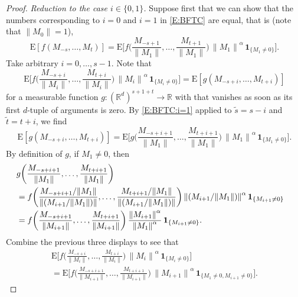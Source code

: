 \documentclass{aptpubarxiv}
\numberwithin{equation}{section}
\begin{document}
\begin{proof}
\emph{Reduction to the case $i \in \{ 0, 1 \}$.}
Suppose first that we can show that the numbers corresponding to $i = 0$ and $i = 1$ in \eqref{E:BFTC} are equal, that is (note that $\|M_0\|=1$),
\begin{equation}
\label{E:BFTC:i=1}
  {\mathrm{E}} [ f ( M_{-s}, \ldots, M_t ) ] 
  = {\mathrm{E}} \biggl[ f \biggl( \frac{M_{-s+1}}{{\|{M_1}\|}}, \ldots, \frac{M_{t+1}}{{\|{M_1}\|}} \biggr) \, {\|{M_1}\|}^\alpha \, {\boldsymbol{1}}_{ \{ M_1 \ne 0 \} } \biggr].
\end{equation}
Take arbitrary $i = 0, \ldots, s-1$. Note that
\[
  {\mathrm{E}} \biggl[ f \biggl( \frac{M_{-s+i}}{{\|{M_i}\|}}, \ldots, \frac{M_{t+i}}{{\|{M_i}\|}} \biggr) \, {\|{M_i}\|}^\alpha \, {\boldsymbol{1}}_{ \{ M_i \ne 0 \} } \biggr]
  = {\mathrm{E}} [ g( M_{-s+i}, \ldots, M_{t+i} )]
\]
for a measurable function $g : ({\mathbb{R}}^d)^{s+1+t} \to {\mathbb{R}}$ with
that vanishes as soon as its first $d$-tuple of arguments is zero. By \eqref{E:BFTC:i=1} applied to $\tilde{s}=s-i$ and $\tilde{t}=t+i$, we find
\[
  {\mathrm{E}} [ g( M_{-s+i}, \ldots, M_{t+i} )]
  = {\mathrm{E}} \biggl[ g \biggl( \frac{M_{-s+i+1}}{{\|{M_1}\|}}, \ldots, \frac{M_{t+i+1}}{{\|{M_1}\|}} \biggr) \, {\|{M_1}\|}^\alpha \, {\boldsymbol{1}}_{ \{ M_1 \ne 0 \} } \biggr].
\]
By definition of $g$, if $M_1 \ne 0$, then
\begin{align*}
  \lefteqn{
  g \biggl( \frac{M_{-s+i+1}}{{\|{M_1}\|}}, \ldots, \frac{M_{t+i+1}}{{\|{M_1}\|}} \biggr)
  } \\
  &= f \biggl( \frac{M_{-s+i+1} / {\|{M_1}\|}}{{\|{(M_{i+1} / {\|{M_1}\|})}\|}}, \ldots, \frac{M_{t+i+1} / {\|{M_1}\|}}{{\|{(M_{i+1} / {\|{M_1}\|})}\|}}  \biggr) \, {\|{(M_{i+1} / {\|{M_1}\|})}\|}^\alpha \, {\boldsymbol{1}}_{ \{ M_{i+1} \ne 0 \} } \\
  &= f \biggl( \frac{M_{-s+i+1}}{{\|{M_{i+1}}\|}}, \ldots, \frac{M_{t+i+1}}{{\|{M_{i+1}}\|}} \biggr) \, \frac{{\|{M_{i+1}}\|}^\alpha}{{\|{M_1}\|}^\alpha} \, {\boldsymbol{1}}_{ \{ M_{i+1} \ne 0 \} }.
\end{align*}
Combine the previous three displays to see that
\begin{multline*}
  {\mathrm{E}} \biggl[ f \biggl( \frac{M_{-s+i}}{{\|{M_i}\|}}, \ldots, \frac{M_{t+i}}{{\|{M_i}\|}} \biggr) \, {\|{M_i}\|}^\alpha \, {\boldsymbol{1}}_{ \{ M_i \ne 0 \} } \biggr] \\
  = {\mathrm{E}} \biggl[ f \biggl( \frac{M_{-s+i+1}}{{\|{M_{i+1}}\|}}, \ldots, \frac{M_{t+i+1}}{{\|{M_{i+1}}\|}} \biggr) \, {\|{M_{i+1}}\|}^\alpha \, {\boldsymbol{1}}_{ \{ M_1 \ne 0, M_{i+1} \ne 0 \} } \biggr].

\end{multline*}
\end{proof}
\end{document}
